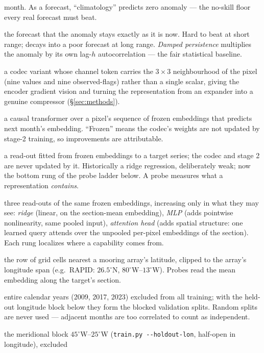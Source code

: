 \documentclass[10pt]{article}
\begin{document}
\begin{description}
  month. As a forecast, ``climatology'' predicts zero anomaly ---
  the no-skill floor every real forecast must beat.
\item[Persistence] the forecast that the anomaly stays exactly as it is
  now. Hard to beat at short range; decays into a poor forecast at long
  range. \emph{Damped persistence} multiplies the anomaly by its own
  lag-$h$ autocorrelation --- the fair statistical baseline.
\item[Patch codec] a codec variant whose channel token carries the
  $3\times3$ neighbourhood of the pixel (nine values and nine
  observed-flags) rather than a single scalar, giving the encoder
  gradient vision and turning the representation from an expander into a
  genuine compressor (\S\ref{sec:methods}).
\item[Stage 2 / temporal model] a causal transformer over a pixel's
  sequence of frozen embeddings that predicts next month's embedding.
  ``Frozen'' means the codec's weights are not updated by stage-2
  training, so improvements are attributable.
\item[Probe] a read-out fitted from frozen embeddings to a target
  series; the codec and stage 2 are never updated by it. Historically a
  ridge regression, deliberately weak; now the bottom rung of the probe
  ladder below. A probe measures what a representation \emph{contains}.
\item[Probe ladder] three read-outs of the same frozen embeddings,
  increasing only in what they may see: \emph{ridge} (linear, on the
  section-mean embedding), \emph{MLP} (adds pointwise nonlinearity, same
  pooled input), \emph{attention head} (adds spatial structure: one
  learned query attends over the unpooled per-pixel embeddings of the
  section). Each rung localizes where a capability comes from.
\item[Section] the row of grid cells nearest a mooring array's
  latitude, clipped to the array's longitude span (e.g.\ RAPID:
  $26.5^\circ$N, $80^\circ$W--$13^\circ$W). Probes read the mean
  embedding along the target's section.
\item[Holdout years] entire calendar years (2009, 2017, 2023) excluded
  from all training; with the held-out longitude block below they
  form the blocked validation splits. Random splits are never used ---
  adjacent months are too correlated to count as independent.
\item[Holdout longitudes] the meridional block $45^\circ$W--$25^\circ$W
  (\texttt{train.py -{}-holdout-lon}, half-open in longitude), excluded

\end{description}
\end{document}
